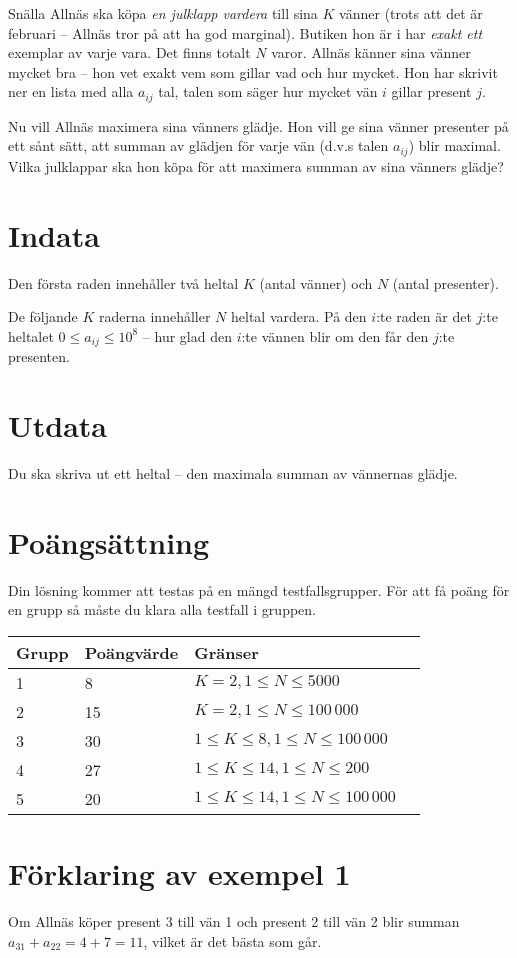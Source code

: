 Snälla Allnäs ska köpa \emph{en julklapp vardera} till sina $K$ vänner (trots att det är februari -- Allnäs tror på att ha god marginal).
Butiken hon är i har \emph{exakt ett} exemplar av varje vara.
Det finns totalt $N$ varor.
Allnäs känner sina vänner mycket bra -- hon vet exakt vem som gillar vad och hur mycket.
Hon har skrivit ner en lista med alla $a_{ij}$ tal, talen som säger hur mycket vän $i$ gillar present $j$.

Nu vill Allnäs maximera sina vänners glädje.
Hon vill ge sina vänner presenter på ett sånt sätt, att summan av glädjen för varje vän (d.v.s talen $a_{ij}$) blir maximal.
Vilka julklappar ska hon köpa för att maximera summan av sina vänners glädje?

\section*{Indata}
Den första raden innehåller två heltal $K$ (antal vänner) och $N$ (antal presenter).

De följande $K$ raderna innehåller $N$ heltal vardera.
På den $i$:te raden är det $j$:te heltalet $0 \le a_{ij} \le 10^8$ -- hur glad den $i$:te vännen blir om den får den $j$:te presenten.

\section*{Utdata}
Du ska skriva ut ett heltal -- den maximala summan av vännernas glädje.

\section*{Poängsättning}
Din lösning kommer att testas på en mängd testfallsgrupper. För att få poäng för en grupp
så måste du klara alla testfall i gruppen.

\noindent
\begin{tabular}{| l | l | l | l |}
\hline
Grupp & Poängvärde & Gränser \\ \hline
1     & 8          & $K = 2, 1 \le N \le 5000$ \\ \hline
2     & 15         & $K = 2, 1 \le N \le 100\,000$ \\ \hline
3     & 30         & $1 \le K \le 8, 1 \le N \le 100\,000$ \\ \hline
4     & 27         & $1 \le K \le 14, 1 \le N \le 200$ \\ \hline
5     & 20         & $1 \le K \le 14, 1 \le N \le 100\,000$ \\ \hline
\end{tabular}

\section*{Förklaring av exempel 1}
Om Allnäs köper present 3 till vän 1 och present 2 till vän 2 blir summan $a_{31} + a_{22} = 4 + 7 = 11$, vilket är det bästa som går.

